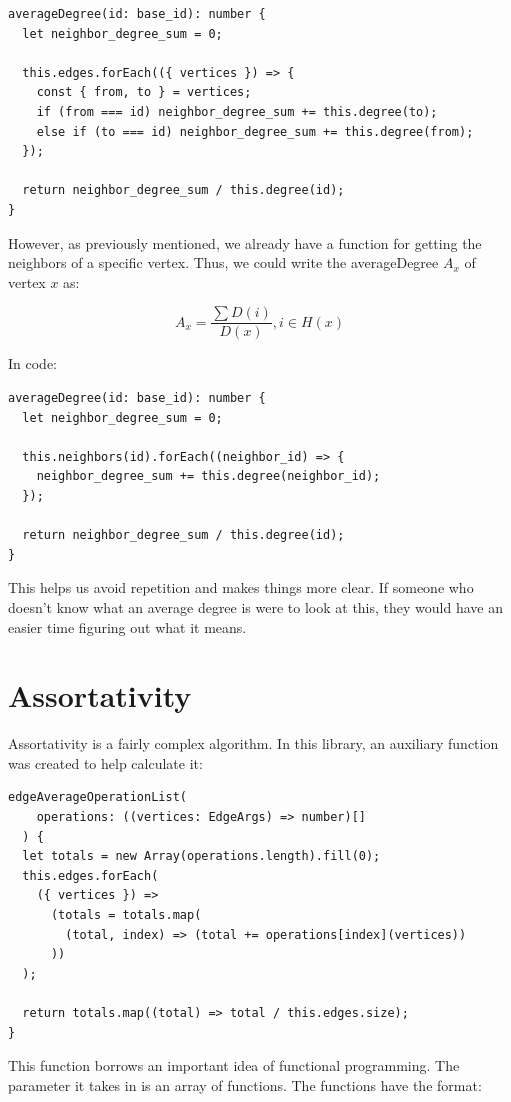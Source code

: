 \begin{verbatim}
averageDegree(id: base_id): number {
  let neighbor_degree_sum = 0;

  this.edges.forEach(({ vertices }) => {
    const { from, to } = vertices;
    if (from === id) neighbor_degree_sum += this.degree(to);
    else if (to === id) neighbor_degree_sum += this.degree(from);
  });

  return neighbor_degree_sum / this.degree(id);
}
\end{verbatim}

However, as previously mentioned, we already have a function for getting the neighbors of
a specific vertex.
Thus, we could write the averageDegree $A_x$ of vertex $x$ as:

$$A_x=\frac{\sum{D(i)}}{D(x)}, i\in H(x)$$

In code:

\begin{verbatim}
averageDegree(id: base_id): number {
  let neighbor_degree_sum = 0;

  this.neighbors(id).forEach((neighbor_id) => {
    neighbor_degree_sum += this.degree(neighbor_id);
  });

  return neighbor_degree_sum / this.degree(id);
}
\end{verbatim}

This helps us avoid repetition and makes things more clear.
If someone who doesn't know what an average degree is were to look at this,
they would have an easier time figuring out what it means.

\section{Assortativity}

Assortativity is a fairly complex algorithm.
In this library, an auxiliary function was created to help calculate it:

\begin{verbatim}
edgeAverageOperationList(
    operations: ((vertices: EdgeArgs) => number)[]
  ) {
  let totals = new Array(operations.length).fill(0);
  this.edges.forEach(
    ({ vertices }) =>
      (totals = totals.map(
        (total, index) => (total += operations[index](vertices))
      ))
  );

  return totals.map((total) => total / this.edges.size);
}
\end{verbatim}

This function borrows an important idea of functional programming.
The parameter it takes in is an array of functions.
The functions have the format:

